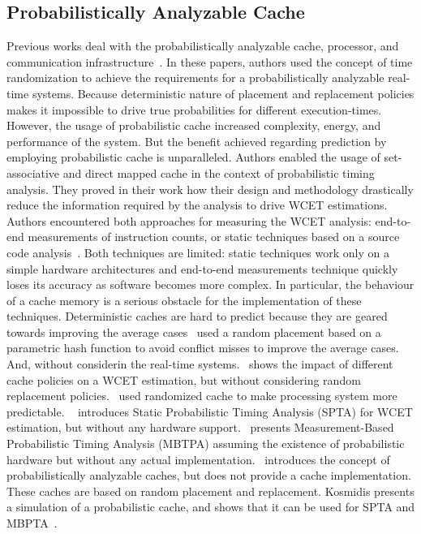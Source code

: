 \subsection{Probabilistically Analyzable Cache}

Previous works deal with the probabilistically analyzable cache, processor, and communication infrastructure~\cite{mezzetti2015randomized, cucu2012measurement, Jalle:2014:BDT:2616606.2616668}. In these papers, authors used the concept of time randomization to achieve the requirements for a probabilistically analyzable real-time systems. Because deterministic nature of placement and replacement policies makes it impossible to drive true probabilities for different execution-times. However, the usage of probabilistic cache increased complexity, energy, and performance of the system. But the benefit achieved regarding prediction by employing probabilistic cache is unparalleled. Authors enabled the usage of set-associative and direct mapped cache in the context of probabilistic timing analysis. They proved in their work how their design and methodology drastically reduce the information required by the analysis to drive WCET estimations. Authors encountered both approaches for measuring the WCET analysis: end-to-end
measurements of instruction counts, or static techniques based on
a source code analysis~\cite{Wilhelm:2008:WEP:1347375.1347389}.  Both
techniques are limited: static techniques work only on a simple hardware
architectures and end-to-end measurements technique quickly loses its accuracy
as software becomes more complex.  In particular, the behaviour of a cache memory is a serious obstacle for the  implementation of these
techniques. Deterministic caches are hard to predict because they are geared
towards improving the average
cases~\cite{Kosmidis:2013:CDP:2485288.2485416, Topham:1999:RCP:297703.297715} used a random placement based on
a parametric hash function to avoid conflict misses to improve
the average cases. And, without considerin the real-time systems.~\cite{Reineke:2007:TPC:1290860.1290864} shows the impact of different
cache policies on a WCET estimation, but without considering random
replacement policies.~\cite{ARM} used randomized cache to make processing system more predictable. 
~\cite{David:2004:SDP:1009383.1009841} introduces Static Probabilistic
Timing Analysis (SPTA) for WCET estimation, but without any hardware support.~\cite{cucu2012measurement} presents Measurement-Based Probabilistic
Timing Analysis (MBTPA) assuming the existence of probabilistic hardware
but without any actual implementation.~\cite{Cazorla:2013:PPA:2465787.2465796} introduces the concept of
probabilistically analyzable caches, but does not provide a cache
implementation. These caches are based on random placement and
replacement. Kosmidis presents a simulation of a probabilistic cache, and shows
that it can be used for SPTA and
MBPTA~\cite{Kosmidis:2013:CDP:2485288.2485416}.   

